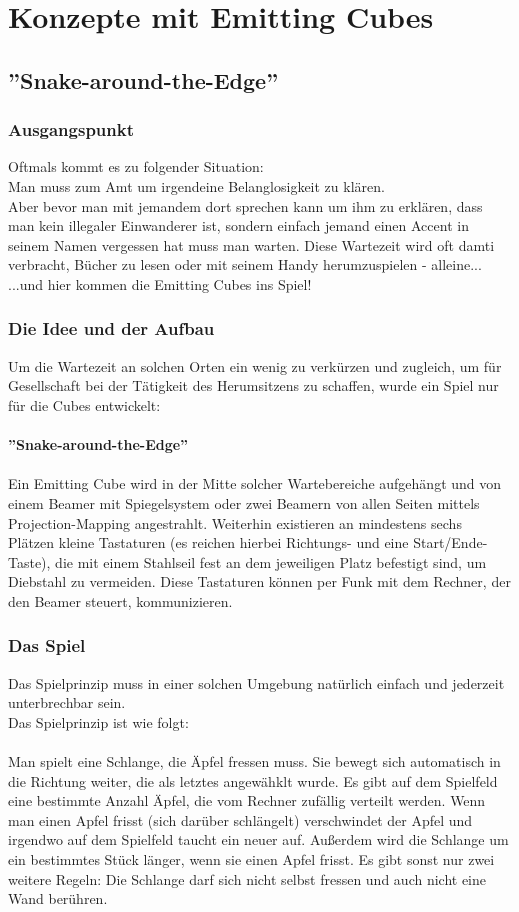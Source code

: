 \documentclass[pdftex,12pt,a4paper]{report}
\begin{document}
\chapter{Konzepte mit Emitting Cubes}
\section{''Snake-around-the-Edge''}
\subsection{Ausgangspunkt}
Oftmals kommt es zu folgender Situation:\\
Man muss zum Amt um irgendeine Belanglosigkeit zu klären.\\
Aber bevor man mit jemandem dort sprechen kann um ihm zu erklären, dass man kein illegaler Einwanderer ist, sondern einfach jemand einen Accent in seinem Namen vergessen hat muss man warten.
Diese Wartezeit wird oft damti verbracht, Bücher zu lesen oder mit seinem Handy herumzuspielen - alleine...\\
...und hier kommen die Emitting Cubes ins Spiel!

\subsection{Die Idee und der Aufbau}
Um die Wartezeit an solchen Orten ein wenig zu verkürzen und zugleich, um für Gesellschaft bei der Tätigkeit des Herumsitzens zu schaffen, wurde ein Spiel nur für die Cubes entwickelt:\\
\\
\textbf{''Snake-around-the-Edge''}
\\\\
Ein Emitting Cube wird in der Mitte solcher Wartebereiche aufgehängt und von einem Beamer mit Spiegelsystem oder zwei Beamern von allen Seiten mittels Projection-Mapping angestrahlt.
Weiterhin existieren an mindestens sechs Plätzen kleine Tastaturen (es reichen hierbei Richtungs- und eine Start/Ende-Taste), die mit einem Stahlseil fest an dem jeweiligen Platz befestigt sind, um Diebstahl zu vermeiden.
Diese Tastaturen können per Funk mit dem Rechner, der den Beamer steuert, kommunizieren.

\subsection{Das Spiel}
Das Spielprinzip muss in einer solchen Umgebung natürlich einfach und jederzeit unterbrechbar sein.\\
Das Spielprinzip ist wie folgt:\\
\\
Man spielt eine Schlange, die Äpfel fressen muss. Sie bewegt sich automatisch in die Richtung weiter, die als letztes angewähklt wurde.
Es gibt auf dem Spielfeld eine bestimmte Anzahl Äpfel, die vom Rechner zufällig verteilt werden.
Wenn man einen Apfel frisst (sich darüber schlängelt) verschwindet der Apfel und irgendwo auf dem Spielfeld taucht ein neuer auf.
Außerdem wird die Schlange um ein bestimmtes Stück länger, wenn sie einen Apfel frisst.
Es gibt sonst nur zwei weitere Regeln: Die Schlange darf sich nicht selbst fressen und auch nicht eine Wand berühren.
\end{document}
